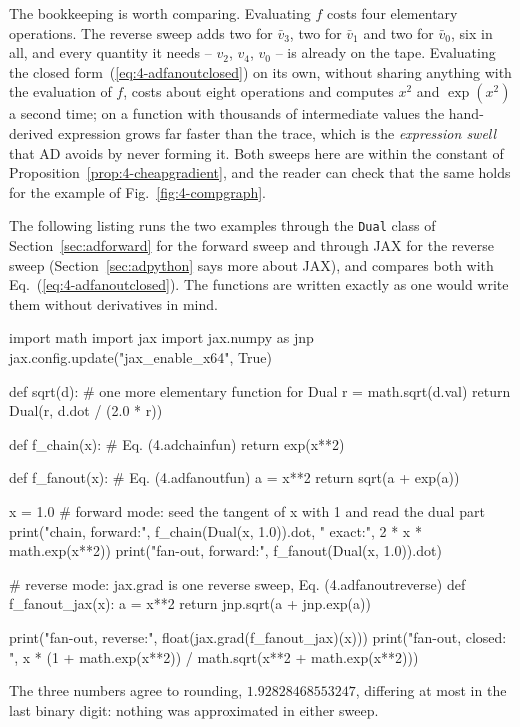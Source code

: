 The bookkeeping is worth comparing.  Evaluating $f$ costs four elementary
operations.  The reverse sweep adds two for $\bar v_3$, two for $\bar v_1$
and two for $\bar v_0$, six in all, and every quantity it needs --
$v_2$, $v_4$, $v_0$ -- is already on the tape.  Evaluating the closed
form~(\ref{eq:4-adfanoutclosed}) on its own, without sharing anything with
the evaluation of $f$, costs about eight operations and computes $x^{2}$
and $\exp(x^{2})$ a second time; on a function with thousands of
intermediate values the hand-derived expression grows far faster than the
trace, which is the \emph{expression swell} that AD avoids by never forming
it.  Both sweeps here are within the constant of
Proposition~\ref{prop:4-cheapgradient}, and the reader can check that the
same holds for the example of Fig.~\ref{fig:4-compgraph}.

The following listing runs the two examples through the \texttt{Dual} class
of Section~\ref{sec:adforward} for the forward sweep and through JAX for
the reverse sweep (Section~\ref{sec:adpython} says more about JAX), and
compares both with Eq.~(\ref{eq:4-adfanoutclosed}).  The functions are
written exactly as one would write them without derivatives in mind.

\begin{Python}{}
import math
import jax
import jax.numpy as jnp
jax.config.update("jax_enable_x64", True)

def sqrt(d):                            # one more elementary function for Dual
    r = math.sqrt(d.val)
    return Dual(r, d.dot / (2.0 * r))

def f_chain(x):                         # Eq. (4.adchainfun)
    return exp(x**2)

def f_fanout(x):                        # Eq. (4.adfanoutfun)
    a = x**2
    return sqrt(a + exp(a))

x = 1.0
# forward mode: seed the tangent of x with 1 and read the dual part
print("chain,   forward:", f_chain(Dual(x, 1.0)).dot, " exact:", 2 * x * math.exp(x**2))
print("fan-out, forward:", f_fanout(Dual(x, 1.0)).dot)

# reverse mode: jax.grad is one reverse sweep, Eq. (4.adfanoutreverse)
def f_fanout_jax(x):
    a = x**2
    return jnp.sqrt(a + jnp.exp(a))

print("fan-out, reverse:", float(jax.grad(f_fanout_jax)(x)))
print("fan-out, closed: ", x * (1 + math.exp(x**2)) / math.sqrt(x**2 + math.exp(x**2)))
\end{Python}

The three numbers agree to rounding, $1.92828468553247$, differing at most
in the last binary digit: nothing was approximated in either sweep.

